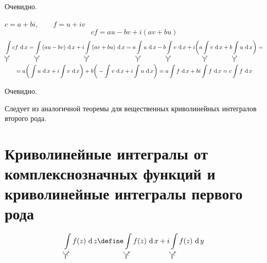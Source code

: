 \begin{eproof}
	\item Очевидно.
	\item $ c = a + bi, \qquad f = u + iv $
	$$ cf = au - bv + i(av + bu) $$
	\begin{multline*}
		\cint[x]{\curvedir \Gamma}{cf} = \cint[x]{\curvedir \Gamma}{(au - bv)} + i \cint[x]{\curvedir \Gamma}{(av + bu)} = a \cint[x]{\curvedir \Gamma}u - b \cint[x]{\curvedir \Gamma}v + i \bigg( a \cint[x]{\curvedir \Gamma}v + b \cint[x]{\curvedir \Gamma}u \bigg) = \\
		= a \bigg( \sint[x]u + i \sint[x]v \bigg) + b \bigg( - \sint[x]v + i \sint[x]u \bigg) = a \sint[x]f + bi \sint f = c \sint f
	\end{multline*}
	\item Очевидно.
	\item Следует из аналогичной теоремы для вещественных криволинейных интегралов второго рода.
\end{eproof}

\section{Криволинейные интегралы от комплекснозначных функций и криволинейные интегралы первого рода}

\begin{definition}
	$$ \cint[z]{\curvedir\Gamma}{f(z)} \define \cint[x]{\curvedir\Gamma}{f(z)} + i \cint[y]{\curvedir\Gamma}{f(z)} $$
\end{definition}

